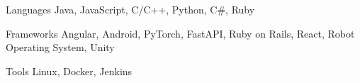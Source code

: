 
\begin{cvskills}
  \cvskill
    {Languages} %
    {Java, JavaScript, C/C++, Python, C\#, Ruby} %

  \cvskill
    {Frameworks} %
    {Angular, Android, PyTorch, FastAPI, Ruby on Rails, React, Robot Operating System, Unity} %

  \cvskill
    {Tools} %
    {Linux, Docker, Jenkins} %
\end{cvskills}
